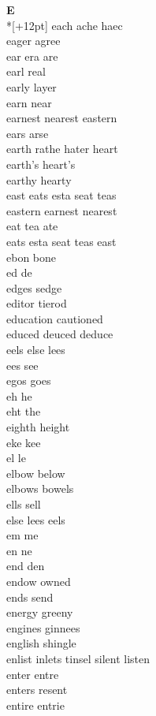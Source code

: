 \vspace{14pt}
\noindent\textbf{\Large E}\\*[+12pt]
each ache haec\\
eager agree\\
ear era are\\
earl real\\
early layer\\
earn near\\
earnest nearest eastern\\
ears arse\\
earth rathe hater heart\\
earth's heart's\\
earthy hearty\\
east eats esta seat teas\\
eastern earnest nearest\\
eat tea ate\\
eats esta seat teas east\\
ebon bone\\
ed de\\
edges sedge\\
editor tierod\\
education cautioned\\
educed deuced deduce\\
eels else lees\\
ees see\\
egos goes\\
eh he\\
eht the\\
eighth height\\
eke kee\\
el le\\
elbow below\\
elbows bowels\\
ells sell\\
else lees eels\\
em me\\
en ne\\
end den\\
endow owned\\
ends send\\
energy greeny\\
engines ginnees\\
english shingle\\
enlist inlets tinsel silent listen\\
enter entre\\
enters resent\\
entire entrie\\
